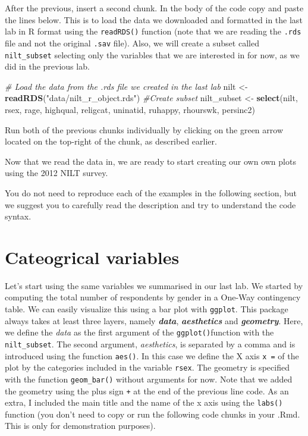 \documentclass[
]{book}
\newenvironment{Shaded}{\begin{snugshade}}{\end{snugshade}}
\newcommand{\CommentTok}[1]{\textcolor[rgb]{0.56,0.35,0.01}{\textit{#1}}}
\newcommand{\FunctionTok}[1]{\textcolor[rgb]{0.13,0.29,0.53}{\textbf{#1}}}
\newcommand{\NormalTok}[1]{#1}
\newcommand{\OtherTok}[1]{\textcolor[rgb]{0.56,0.35,0.01}{#1}}
\newcommand{\StringTok}[1]{\textcolor[rgb]{0.31,0.60,0.02}{#1}}
\begin{document}
After the previous, insert a second chunk. In the body of the code copy and paste the lines below. This is to load the data we downloaded and formatted in the last lab in R format using the \texttt{readRDS()} function (note that we are reading the \texttt{.rds} file and not the original \texttt{.sav} file). Also, we will create a subset called \texttt{nilt\_subset} selecting only the variables that we are interested in for now, as we did in the previous lab.

\begin{Shaded}
\begin{Highlighting}[]
\CommentTok{\# Load the data from the .rds file we created in the last lab}
\NormalTok{nilt }\OtherTok{\textless{}{-}} \FunctionTok{readRDS}\NormalTok{(}\StringTok{"data/nilt\_r\_object.rds"}\NormalTok{)}
\CommentTok{\#Create subset}
\NormalTok{nilt\_subset }\OtherTok{\textless{}{-}} \FunctionTok{select}\NormalTok{(nilt, rsex, rage, highqual, religcat, uninatid,  ruhappy, rhourswk, persinc2)}
\end{Highlighting}
\end{Shaded}

Run both of the previous chunks individually by clicking on the green arrow located on the top-right of the chunk, as described earlier.

Now that we read the data in, we are ready to start creating our own own plots using the 2012 NILT survey.

You do not need to reproduce each of the examples in the following section, but we suggest you to carefully read the description and try to understand the code syntax.

\hypertarget{cateogrical-variables}{%
\section{Cateogrical variables}\label{cateogrical-variables}}

Let's start using the same variables we summarised in our last lab. We started by computing the total number of respondents by gender in a One-Way contingency table. We can easily visualize this using a bar plot with \texttt{ggplot}. This package always takes at least three layers, namely \emph{\textbf{data}}, \emph{\textbf{aesthetics}} and \emph{\textbf{geometry}}. Here, we define the \emph{data} as the first argument of the \texttt{ggplot()}function with the \texttt{nilt\_subset}. The second argument, \emph{aesthetics}, is separated by a comma and is introduced using the function \texttt{aes()}. In this case we define the X axis \texttt{x\ =} of the plot by the categories included in the variable \texttt{rsex}. The geometry is specified with the function \texttt{geom\_bar()} without arguments for now. Note that we added the geometry using the plus sign \texttt{+} at the end of the previous line code. As an extra, I included the main title and the name of the x axis using the \texttt{labs()} function (you don't need to copy or run the following code chunks in your .Rmd. This is only for demonstration purposes).
\end{document}
